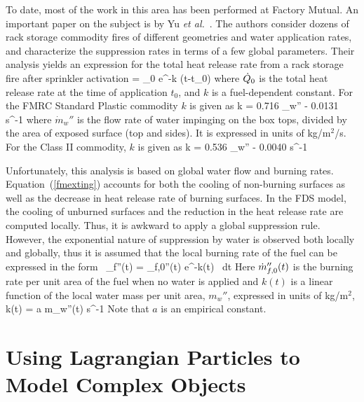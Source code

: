 To date, most of the work in this area has been
performed at Factory Mutual. An important paper on the subject is
by Yu {\em et al.}~\cite{Yu:1}. The authors consider dozens of
rack storage commodity fires of different geometries and water
application rates, and characterize the suppression rates in terms of
a few global parameters. Their analysis yields an
expression for the total heat release rate from a rack storage fire
after sprinkler activation
\be \dQ = \dQ_0 \; e^{-k (t-t_0)}  \label{fmexting} \ee
where $\dot{Q}_0$ is the total heat release rate at the time of application
$t_0$, and $k$ is a fuel-dependent constant.
For the FMRC Standard Plastic commodity $k$ is given as
\be k = 0.716 \; _w'' - 0.0131 \quad  \hbox{s}^{-1} \ee
where $\dot{m}_w''$ is the flow rate of water impinging on the
box tops, divided by the area of exposed surface (top and sides). It is
expressed in units of kg/m$^2$/s. For the Class II commodity, $k$ is
given as
\be k = 0.536 \; _w'' - 0.0040 \quad  \hbox{s}^{-1} \ee

Unfortunately, this analysis is based on global water flow and
burning rates. Equation~(\ref{fmexting})
accounts for both the cooling of non-burning surfaces as well as the
decrease in heat release rate of burning surfaces. In the FDS model,
the cooling of unburned surfaces and the reduction in the heat
release rate are computed locally. Thus, it is awkward to apply a
global suppression rule.
However, the exponential nature of suppression by water is observed
both locally and globally, thus it is assumed that the local burning rate
of the fuel can be expressed in the form~\cite{Hamins:1,Hamins:IAFSS2002}
\be \dm_f''(t) = \dm_{f,0}''(t) \; e^{-\int k(t) \, dt}
\label{nistexting} \ee
Here $\dot{m}_{f,0}''(t)$ is the burning rate per unit area of the fuel
when no water is applied and $k(t)$ is a linear function of the local water
mass per unit area, $m_w''$, expressed in units of kg/m$^2$,
\be k(t) = a \; m_w''(t) \quad   \hbox{s}^{-1} \ee
Note that $a$ is an empirical constant.



\clearpage

\section{Using Lagrangian Particles to Model Complex Objects}

